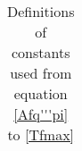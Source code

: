\documentclass[a4paper, 12pt]{article}
\begin{document}
\begin{appendices}
\begin{table}[!ht]
\begin{tabular}{llll}
\end{tabular}
\caption{Definitions of constants used from equation \ref{Afq'''pi} to \ref{Tfmax}}\label{table2}
\end{table}

\end{appendices}


\end{document}
